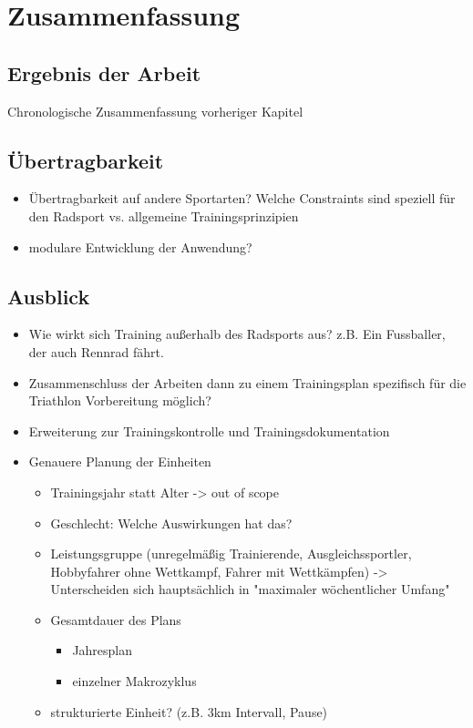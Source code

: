 \chapter{Zusammenfassung}
\label{sec:zusammenfassung}
\section{Ergebnis der Arbeit}
\label{sec:zusammenfassung:ergebnis}
Chronologische Zusammenfassung vorheriger Kapitel

\section{Übertragbarkeit}
\begin{itemize}
    \item Übertragbarkeit auf andere Sportarten? Welche Constraints sind speziell für den Radsport vs. allgemeine Trainingsprinzipien
    \item modulare Entwicklung der Anwendung?
\end{itemize}

\section{Ausblick}
\label{sec:zusammenfassung:ausblick}
\begin{itemize}
    \item Wie wirkt sich Training außerhalb des Radsports aus? z.B. Ein Fussballer, der auch Rennrad fährt.
    \item Zusammenschluss der Arbeiten dann zu einem Trainingsplan spezifisch für die Triathlon Vorbereitung möglich?
    \item Erweiterung zur Trainingskontrolle und Trainingsdokumentation
    \item Genauere Planung der Einheiten
    \begin{itemize}
        \item Trainingsjahr statt Alter -> out of scope \cite[181]{EinfuerungTrainingswissenschaft}
        \item Geschlecht: Welche Auswirkungen hat das?
        \item Leistungsgruppe \cite[S. 173]{Radsporttraining} (unregelmäßig Trainierende, Ausgleichssportler, Hobbyfahrer ohne Wettkampf, Fahrer mit Wettkämpfen) -> Unterscheiden sich hauptsächlich in "maximaler wöchentlicher Umfang"
        \item Gesamtdauer des Plans
            \begin{itemize}
                \item Jahresplan
                \item einzelner Makrozyklus
            \end{itemize}
        \item  strukturierte Einheit? (z.B. 3km Intervall, Pause)
    \end{itemize}   
\end{itemize}

